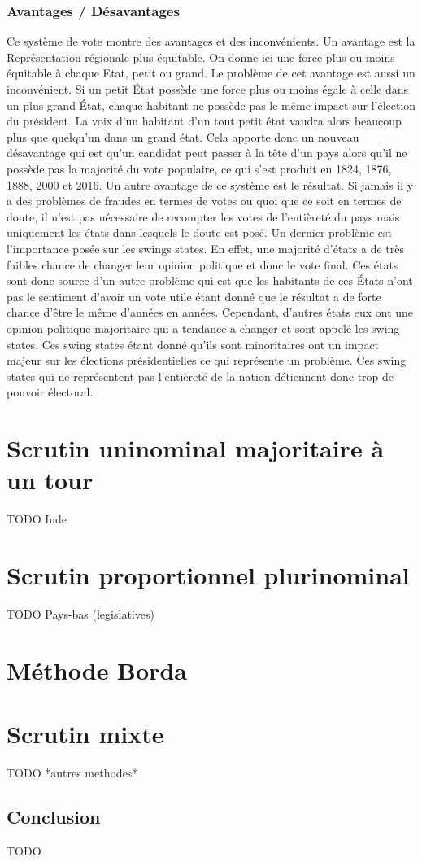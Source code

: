 \documentclass[11pt,a4paper]{report}
\begin{document}
\subsection{Avantages / Désavantages}
Ce système de vote montre des avantages et des inconvénients.
Un avantage est la Représentation régionale plus équitable.
On donne ici une force plus ou moins équitable à chaque Etat, petit ou grand.
Le problème de cet avantage est aussi un inconvénient.
Si un petit État possède une force plus ou moins égale à celle dans un plus grand État, chaque habitant ne possède pas le même impact sur l'élection du président.
La voix d’un habitant d’un tout petit état vaudra alors beaucoup plus que quelqu’un dans un grand état.
Cela apporte donc un nouveau désavantage qui est qu’un candidat peut passer à la tête d’un pays alors qu’il ne possède pas la majorité du vote populaire, ce qui s’est produit en 1824, 1876, 1888, 2000 et 2016.
Un autre avantage de ce système est le résultat.
Si jamais il y a des problèmes de fraudes en termes de votes ou quoi que ce soit en termes de doute, il n’est pas nécessaire de recompter les votes de l'entièreté du pays mais uniquement les états dans lesquels le doute est posé.
Un dernier problème est l’importance posée sur les swings states.
En effet, une majorité d’états a de très faibles chance de changer leur opinion politique et donc le vote final.
Ces états sont donc source d’un autre problème qui est que les habitants de ces États n’ont pas le sentiment d’avoir un vote utile étant donné que le résultat a de forte chance d’être le même d’années en années.
Cependant, d’autres états eux ont une opinion politique majoritaire qui a tendance a changer et sont appelé les swing states.
Ces swing states étant donné qu’ils sont minoritaires ont un impact majeur sur les élections présidentielles ce qui représente un problème.
Ces swing states qui ne représentent pas l'entièreté de la nation détiennent donc trop de pouvoir électoral.


\chapter{Scrutin uninominal majoritaire à un tour}
TODO Inde

\chapter{Scrutin proportionnel plurinominal}
TODO Pays-bas (legislatives)

\chapter{Méthode Borda}

\chapter{Scrutin mixte}

TODO *autres methodes*


\newpage
\section*{Conclusion}
TODO

 

\end{document}
